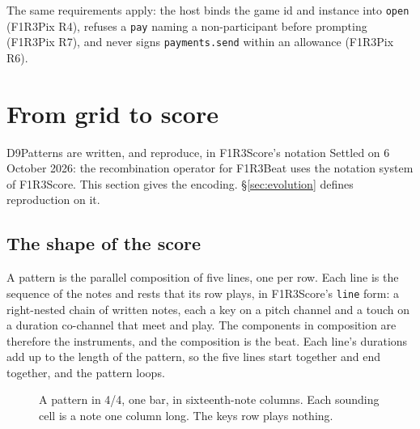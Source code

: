 \documentclass[11pt,a4paper]{article}
\newcommand{\code}[1]{\texttt{#1}}
\newcounter{req}
\begin{document}
The same requirements apply: the host binds the game id and instance into \code{open}
(F1R3Pix R4), refuses a \code{pay} naming a non-participant before prompting (F1R3Pix R7), and
never signs \code{payments.send} within an allowance (F1R3Pix R6).

\section{From grid to score}\label{sec:score}

\begin{settled}{D9}{Patterns are written, and reproduce, in F1R3Score's notation}
Settled on 6 October 2026: the recombination operator for F1R3Beat uses the notation system of
F1R3Score. This section gives the encoding. \S\ref{sec:evolution} defines reproduction on it.
\end{settled}

\subsection{The shape of the score}

A pattern is the parallel composition of five lines, one per row. Each line is the sequence of
the notes and rests that its row plays, in F1R3Score's \code{line} form: a right-nested chain of
written notes, each a key on a pitch channel and a touch on a duration co-channel that meet and
play. The components in composition are therefore the instruments, and the composition is the
beat. Each line's durations add up to the length of the pattern, so the five lines start
together and end together, and the pattern loops.

\begin{figure}[h]
\centering
\begin{tikzpicture}\end{tikzpicture}
\caption{A pattern in 4/4, one bar, in sixteenth-note columns. Each sounding cell is a note one
column long. The keys row plays nothing.}
\label{fig:mother}
\end{figure}
\end{document}
